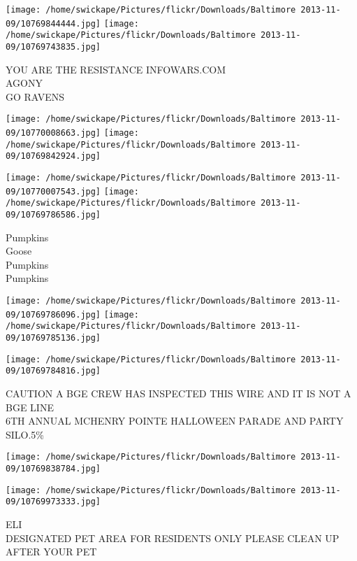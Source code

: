 \documentclass[10pt,letterpaper]{article}
\begin{document}
\vspace{0.25in}
\texttt{[image: /home/swickape/Pictures/flickr/Downloads/Baltimore 2013-11-09/10769844444.jpg]}
\texttt{[image: /home/swickape/Pictures/flickr/Downloads/Baltimore 2013-11-09/10769743835.jpg]}

YOU ARE THE RESISTANCE INFOWARS.COM\\
AGONY\\
GO RAVENS\\
\pagebreak

\texttt{[image: /home/swickape/Pictures/flickr/Downloads/Baltimore 2013-11-09/10770008663.jpg]}
\texttt{[image: /home/swickape/Pictures/flickr/Downloads/Baltimore 2013-11-09/10769842924.jpg]}

\texttt{[image: /home/swickape/Pictures/flickr/Downloads/Baltimore 2013-11-09/10770007543.jpg]}
\texttt{[image: /home/swickape/Pictures/flickr/Downloads/Baltimore 2013-11-09/10769786586.jpg]}

Pumpkins\\
Goose\\
Pumpkins\\
Pumpkins\\
\pagebreak

\texttt{[image: /home/swickape/Pictures/flickr/Downloads/Baltimore 2013-11-09/10769786096.jpg]}
\texttt{[image: /home/swickape/Pictures/flickr/Downloads/Baltimore 2013-11-09/10769785136.jpg]}

\vspace{0.25in}
\texttt{[image: /home/swickape/Pictures/flickr/Downloads/Baltimore 2013-11-09/10769784816.jpg]}

CAUTION A BGE CREW HAS INSPECTED THIS WIRE AND IT IS NOT A BGE LINE\\
6TH ANNUAL MCHENRY POINTE HALLOWEEN PARADE AND PARTY\\
SILO.5\%\\
\pagebreak

\texttt{[image: /home/swickape/Pictures/flickr/Downloads/Baltimore 2013-11-09/10769838784.jpg]}

\vspace{0.25in}
\texttt{[image: /home/swickape/Pictures/flickr/Downloads/Baltimore 2013-11-09/10769973333.jpg]}

ELI\\
DESIGNATED PET AREA FOR RESIDENTS ONLY PLEASE CLEAN UP AFTER YOUR PET\\
\pagebreak
\end{document}
